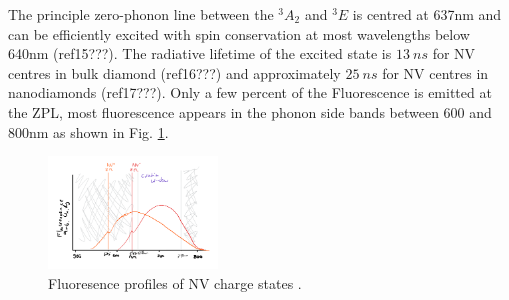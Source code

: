 \documentclass[,prl,twocolumn]{revtex4}
\begin{document}
 
The principle zero-phonon line between the $^3A_2$ and $^3E$ is centred at 637nm and can be efficiently excited with spin conservation at most wavelengths below 640nm (ref15???). The radiative lifetime of the excited state is $\SI{13}{ns}$ for NV centres in bulk diamond (ref16???) and approximately $\SI{25}{ns}$ for NV centres in nanodiamonds (ref17???). Only a few percent of the Fluorescence is emitted at the ZPL, most fluorescence appears in the phonon side bands between 600 and 800nm as shown in Fig. \ref{FigFluoro}.

\begin{figure}[t]
  \centering
  \includegraphics[width=0.4\textwidth]{Fluoro.png} 
 \caption{ Fluoresence profiles of NV charge states .} \label{FigFluoro}
\end{figure}
\end{document}
